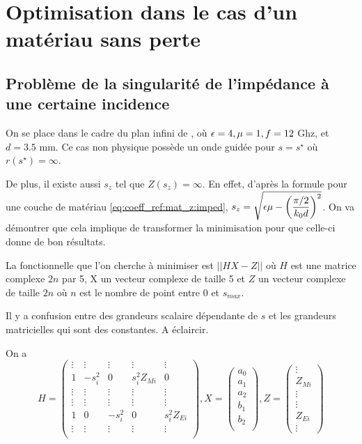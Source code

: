 \section{Optimisation dans le cas d'un matériau sans perte}

\subsection{Problème de la singularité de l'impédance à une certaine incidence}
On se place dans le cadre du plan infini de \cite{soudais_3d_2017}, où $\epsilon=4,\mu=1,f=12$ Ghz, et $d=3.5$ mm. Ce cas non physique possède un onde guidée pour $s=s^\star$ où $r(s^\star) = \infty$. 

De plus, il existe aussi $s_z$ tel que $Z(s_z) = \infty$. En effet, d'après la formule pour une couche de matériau \eqref{eq:coeff_ref:mat_z:imped}, $s_z = \sqrt{\epsilon \mu - \left(\dfrac{\pi/2}{k_0 d}\right)^2}$. On va démontrer que cela implique de transformer la minimisation pour que celle-ci donne de bon résultats.

La fonctionnelle que l'on cherche à minimiser est $||H X - Z||$ où $H$ est une matrice complexe $2n$ par 5, X un vecteur complexe de taille 5 et $Z$ un vecteur complexe de taille $2n$ où $n$ est le nombre de point entre 0 et $s_{max}$. 

{
  \color{red} Il y a confusion entre des grandeurs scalaire dépendante de $s$ et les grandeurs matricielles qui sont des constantes. A éclaircir.
}

On a 
\[
  H = \begin{pmatrix}
  \vdots & \vdots & \vdots & \vdots &\vdots \\
  1 & -s_i^2 & 0 & s_i^2 Z_{Mi} & 0 \\
  \vdots & \vdots & \vdots & \vdots &\vdots \\
  \vdots & \vdots & \vdots & \vdots &\vdots \\
  1 & 0 &-s_i^2 & 0 & s_i^2 Z_{Ei} \\
  \vdots & \vdots & \vdots & \vdots &\vdots \\
  \end{pmatrix},
  X = \begin{pmatrix}
  a_0\\
  a_1\\
  a_2\\
  b_1\\
  b_2\\
  \end{pmatrix},
  Z=\begin{pmatrix}
  \vdots\\
  Z_{Mi}\\
  \vdots\\
  \vdots\\
  Z_{Ei}\\
  \vdots
  \end{pmatrix}
\]

